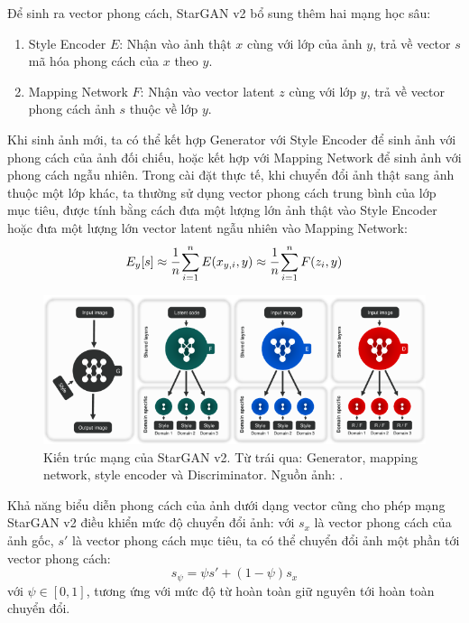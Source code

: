 \documentclass[12pt]{extreport}
\begin{document}
Để sinh ra vector phong cách, StarGAN v2 bổ sung thêm hai mạng học sâu:
\begin{enumerate}
    \item Style Encoder $ E $: Nhận vào ảnh thật $ x $ cùng với lớp của ảnh $ y $, trả về vector $ s $ mã hóa phong cách của $ x $ theo $ y $.
    \item Mapping Network $ F $: Nhận vào vector latent $ z $ cùng với lớp $ y $, trả về vector phong cách ảnh $ s $ thuộc về lớp $ y $.
\end{enumerate}
Khi sinh ảnh mới, ta có thể kết hợp Generator với Style Encoder để sinh ảnh với phong cách của ảnh đối chiếu, hoặc kết hợp với Mapping Network để sinh ảnh với phong cách ngẫu nhiên. Trong cài đặt thực tế, khi chuyển đổi ảnh thật sang ảnh thuộc một lớp khác, ta thường sử dụng vector phong cách trung bình của lớp mục tiêu, được tính bằng cách đưa một lượng lớn ảnh thật vào Style Encoder hoặc đưa một lượng lớn vector latent ngẫu nhiên vào Mapping Network:
$$ E_y[s] \approx \cfrac{1}{n} \sum_{i = 1}^{n} E(x_{y, i}, y) \approx \cfrac{1}{n} \sum_{i = 1}^{n} F(z_{i}, y) $$

\begin{figure}[H]
    \centering
    \includegraphics[width=\linewidth]{figure23.png}
    \caption{Kiến trúc mạng của StarGAN v2. Từ trái qua: Generator, mapping network, style encoder và Discriminator. Nguồn ảnh: \cite{DBLP:journals/corr/abs-1912-01865}.}
\end{figure}

Khả năng biểu diễn phong cách của ảnh dưới dạng vector cũng cho phép mạng StarGAN v2 điều khiển mức độ chuyển đổi ảnh: với $ s_{x} $ là vector phong cách của ảnh gốc, $ s' $ là vector phong cách mục tiêu, ta có thể chuyển đổi ảnh một phần tới vector phong cách:
$$ s_{\psi} = \psi s' + (1 - \psi) s_{x} $$
với $ \psi \in [0, 1] $, tương ứng với mức độ từ hoàn toàn giữ nguyên tới hoàn toàn chuyển đổi.
\end{document}
